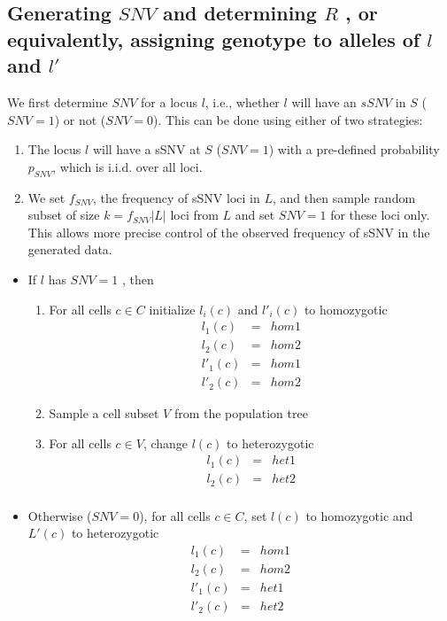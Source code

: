 \documentclass[a4paper,11pt]{article}
\begin{document}
\subsection{Generating $SNV$ and determining $R$ , or equivalently, assigning genotype to alleles of $l$ and $l'$}
\label{sec:generating-ssnv}


We first determine $SNV$ for a locus $l$, i.e., whether $l$ will have
an $sSNV$ in $S$ ($SNV=1$) or not ($SNV=0$). This can be done using
either of two strategies:
\begin{enumerate}
\item The locus $l$ will have a sSNV at $S$ ($SNV=1$) with a
  pre-defined probability $p_{SNV}$, which is i.i.d. over all loci.
\item We set $f_{SNV}$, the frequency of sSNV loci in $L$, and then
  sample random subset of size $k=f_{SNV}|L|$ loci from $L$ and set
  $SNV=1$ for these loci only. This allows more precise control of the
  observed frequency of sSNV in the generated data.
\end{enumerate}

\begin{itemize}
\item If  $l$ has $SNV=1$
  , then
  \begin{enumerate}
  \item For all cells $c\in C$ initialize $l_i(c)$ and $l'_i(c) $ to homozygotic
    \begin{eqnarray*}
      l_1(c) &=& hom1 \\
      l_2(c) &=& hom2 \\
      l'_1(c) &=& hom1 \\
      l'_2(c) &=& hom2 
    \end{eqnarray*}
  \item Sample a cell subset $V$ from the population tree
  \item For all cells $c\in V$, change $l(c)$ to heterozygotic
    \begin{eqnarray*}
      l_1(c) &=& het1 \\
      l_2(c) &=& het2 \\
    \end{eqnarray*}
  \end{enumerate}
\item Otherwise ($SNV=0$), for all cells $c\in C$, set $l(c)$ to homozygotic and $L'(c)$ to heterozygotic
  \begin{eqnarray*}
    l_1(c) &=& hom1 \\
    l_2(c) &=& hom2 \\
    l'_1(c) &=& het1 \\
    l'_2(c) &=& het2 
  \end{eqnarray*}
\end{itemize}
\end{document}
